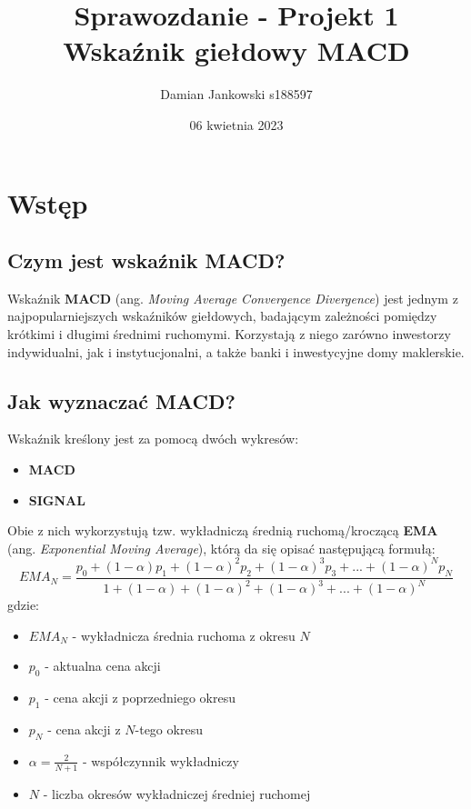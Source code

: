 \documentclass{article}
\title{Sprawozdanie - Projekt 1\\Wskaźnik giełdowy MACD}
\author{Damian Jankowski s188597}
\date{06 kwietnia 2023}
\begin{document}
    \maketitle

    \section{Wstęp}
    \subsection{Czym jest wskaźnik MACD?}
    Wskaźnik \textbf{MACD} (ang. \textit{Moving Average Convergence Divergence}) 
    jest jednym z najpopularniejszych wskaźników giełdowych, badającym
    zależności pomiędzy krótkimi i długimi średnimi ruchomymi.
    Korzystają z niego zarówno inwestorzy indywidualni, 
    jak i instytucjonalni, a także banki i inwestycyjne domy maklerskie.

    \subsection{Jak wyznaczać MACD?}
    Wskaźnik kreślony jest za pomocą dwóch wykresów:
    \begin{itemize}
        \item \textbf{MACD}
        \item \textbf{SIGNAL}
    \end{itemize}

    Obie z nich wykorzystują tzw. wykładniczą średnią ruchomą/kroczącą
    \textbf{EMA} (ang. \textit{Exponential Moving Average}), którą da się opisać
    następującą formułą:
    \begin{equation}
        EMA_{N} = \frac{p_{0} + (1-\alpha)p_{1} + (1-\alpha)^2p_{2} + 
        (1-\alpha)^3p_{3} + ... + (1-\alpha)^Np_{N} }
        {1 + (1-\alpha) + (1-\alpha)^2 + (1-\alpha)^3 + ... + (1-\alpha)^N}
    \end{equation}
    gdzie:
    \begin{itemize}
        \item $EMA_{N}$ - wykładnicza średnia ruchoma z okresu $N$
        \item $p_{0}$ - aktualna cena akcji
        \item $p_{1}$ - cena akcji z poprzedniego okresu
        \item $p_{N}$ - cena akcji z $N$-tego okresu
        \item $\alpha = \frac{2}{N+1}$ - współczynnik wykładniczy
        \item $N$ - liczba okresów wykładniczej średniej ruchomej
    \end{itemize}
\end{document}
